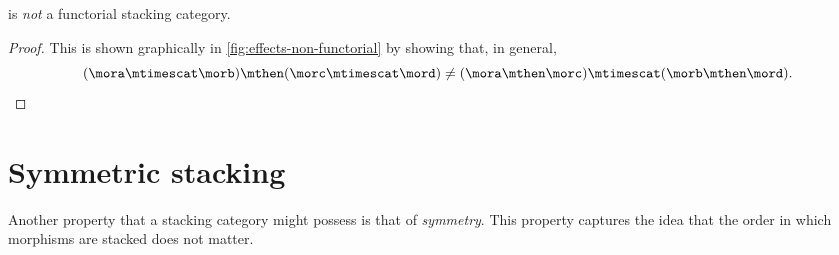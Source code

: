 \begin{lemma}
    \Effects is \emph{not} a functorial stacking category.
\end{lemma}

\begin{proof}
    This is shown graphically in \cref{fig:effects-non-functorial} by showing that, in general,
    \begin{equation}
        (\mora \mtimescat \morb )
        \mthen (\morc \mtimescat \mord )
        \neq
        (\mora \mthen \morc ) \mtimescat (\morb \mthen \mord ).
    \end{equation}
\end{proof}

\begin{figure*}[b]
    \centering
    \caption{Proof that \Effects is not a functorial stacking category by showing that
        the two morphisms above have different representations in \SetL.}
    \label{fig:effects-non-functorial}
\end{figure*}

\section{Symmetric stacking}

Another property that a stacking category might possess is that of \emph{symmetry}.
This property captures the idea that the order in which morphisms are stacked does not matter.

